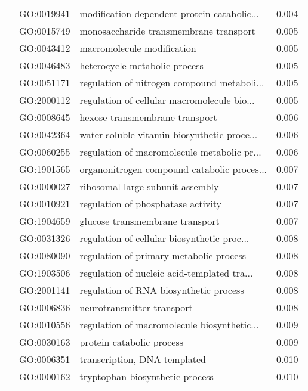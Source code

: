 \begin{longtable}{lllr}
   & GO:0019941 &  modification-dependent protein catabolic... &         0.004 \\
   & GO:0015749 &       monosaccharide transmembrane transport &         0.005 \\
   & GO:0043412 &                   macromolecule modification &         0.005 \\
   & GO:0046483 &                heterocycle metabolic process &         0.005 \\
   & GO:0051171 &  regulation of nitrogen compound metaboli... &         0.005 \\
   & GO:2000112 &  regulation of cellular macromolecule bio... &         0.005 \\
   & GO:0008645 &               hexose transmembrane transport &         0.006 \\
   & GO:0042364 &  water-soluble vitamin biosynthetic proce... &         0.006 \\
   & GO:0060255 &  regulation of macromolecule metabolic pr... &         0.006 \\
   & GO:1901565 &  organonitrogen compound catabolic proces... &         0.007 \\
   & GO:0000027 &             ribosomal large subunit assembly &         0.007 \\
   & GO:0010921 &           regulation of phosphatase activity &         0.007 \\
   & GO:1904659 &              glucose transmembrane transport &         0.007 \\
   & GO:0031326 &  regulation of cellular biosynthetic proc... &         0.008 \\
   & GO:0080090 &      regulation of primary metabolic process &         0.008 \\
   & GO:1903506 &  regulation of nucleic acid-templated tra... &         0.008 \\
   & GO:2001141 &       regulation of RNA biosynthetic process &         0.008 \\
   & GO:0006836 &                   neurotransmitter transport &         0.008 \\
   & GO:0010556 &  regulation of macromolecule biosynthetic... &         0.009 \\
   & GO:0030163 &                    protein catabolic process &         0.009 \\
   & GO:0006351 &                 transcription, DNA-templated &         0.010 \\
   & GO:0000162 &              tryptophan biosynthetic process &         0.010 \\

\end{longtable}

